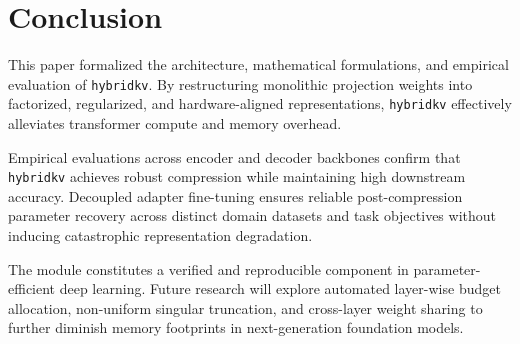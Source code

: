 \section{Conclusion}
This paper formalized the architecture, mathematical formulations, and empirical evaluation of \texttt{hybridkv}. By restructuring monolithic projection weights into factorized, regularized, and hardware-aligned representations, \texttt{hybridkv} effectively alleviates transformer compute and memory overhead.

Empirical evaluations across encoder and decoder backbones confirm that \texttt{hybridkv} achieves robust compression while maintaining high downstream accuracy. Decoupled adapter fine-tuning ensures reliable post-compression parameter recovery across distinct domain datasets and task objectives without inducing catastrophic representation degradation.

The module constitutes a verified and reproducible component in parameter-efficient deep learning. Future research will explore automated layer-wise budget allocation, non-uniform singular truncation, and cross-layer weight sharing to further diminish memory footprints in next-generation foundation models.
